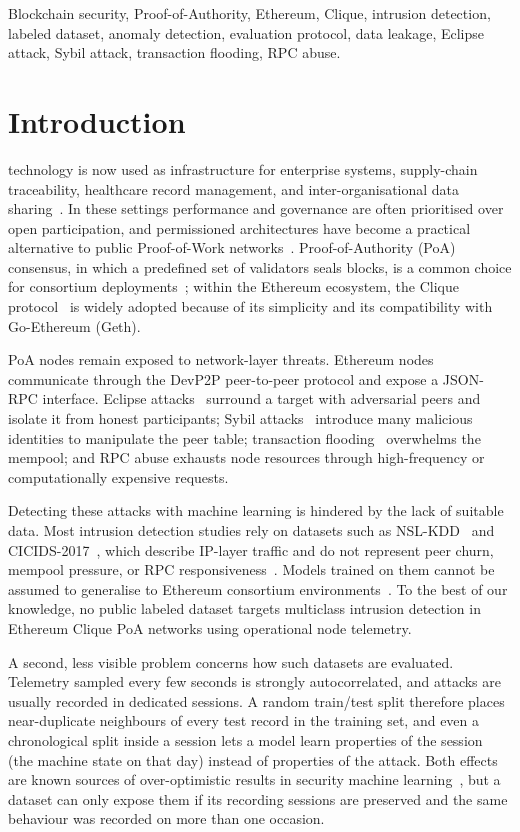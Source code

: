 \documentclass[journal]{IEEEtran}
\begin{document}
\begin{IEEEkeywords}
Blockchain security, Proof-of-Authority, Ethereum, Clique, intrusion detection, labeled dataset, anomaly detection, evaluation protocol, data leakage, Eclipse attack, Sybil attack, transaction flooding, RPC abuse.
\end{IEEEkeywords}

\section{Introduction}
 technology is now used as infrastructure for enterprise systems, supply-chain traceability, healthcare record management, and inter-organisational data sharing~\cite{zheng2018}. In these settings performance and governance are often prioritised over open participation, and permissioned architectures have become a practical alternative to public Proof-of-Work networks~\cite{wood2014}. Proof-of-Authority (PoA) consensus, in which a predefined set of validators seals blocks, is a common choice for consortium deployments~\cite{deangelis2018}; within the Ethereum ecosystem, the Clique protocol~\cite{eip225} is widely adopted because of its simplicity and its compatibility with Go-Ethereum (Geth).

PoA nodes remain exposed to network-layer threats. Ethereum nodes communicate through the DevP2P peer-to-peer protocol and expose a JSON-RPC interface. Eclipse attacks~\cite{heilman2015,marcus2018} surround a target with adversarial peers and isolate it from honest participants; Sybil attacks~\cite{douceur2002} introduce many malicious identities to manipulate the peer table; transaction flooding~\cite{baqer2016} overwhelms the mempool; and RPC abuse exhausts node resources through high-frequency or computationally expensive requests.

Detecting these attacks with machine learning is hindered by the lack of suitable data. Most intrusion detection studies rely on datasets such as NSL-KDD~\cite{tavallaee2009} and CICIDS-2017~\cite{sharafaldin2018}, which describe IP-layer traffic and do not represent peer churn, mempool pressure, or RPC responsiveness~\cite{saad2020}. Models trained on them cannot be assumed to generalise to Ethereum consortium environments~\cite{sommer2010}. To the best of our knowledge, no public labeled dataset targets multiclass intrusion detection in Ethereum Clique PoA networks using operational node telemetry.

A second, less visible problem concerns how such datasets are evaluated. Telemetry sampled every few seconds is strongly autocorrelated, and attacks are usually recorded in dedicated sessions. A random train/test split therefore places near-duplicate neighbours of every test record in the training set, and even a chronological split inside a session lets a model learn properties of the session (the machine state on that day) instead of properties of the attack. Both effects are known sources of over-optimistic results in security machine learning~\cite{arp2022,kapoor2023,pendlebury2019}, but a dataset can only expose them if its recording sessions are preserved and the same behaviour was recorded on more than one occasion.
\end{document}
